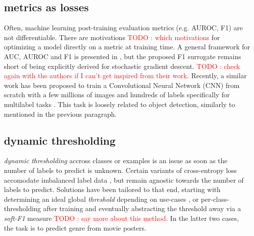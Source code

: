 \documentclass[sigconf,natbib,screen=true,review=true,anonymous]{acmart}
\newcommand\todo[1]{\textcolor{red}{TODO : #1}}
\begin{document}
\subsection{metrics as losses}
\label{sec:org6c111d9}

Often, machine learning post-training evaluation metrics (e.g. AUROC, F1) are not differentiable. There are motivations \todo{which motivations} for optimizing a model directly on a metric at training time. A general framework for AUC, AUROC and F1 is presented in \cite{optimizableLosses}, but the proposed F1 surrogate remains short of being explicitly derived for stochastic gradient descent. \todo{check again with the authors if I can't get inspired from their work}. Recently, a similar work has been proposed to train a Convolutional Neural Network (CNN) from scratch with a few millions of images and hundreds of labels specifically for multilabel tasks \cite{tencent}. This task is loosely related to object detection, similarly to \cite{multitaskLabelImages} mentioned in the previous paragraph.

\subsection{dynamic thresholding}
\label{sec:org543a744}

\emph{dynamic thresholding} accross classes or examples is an issue as soon as the number of labels to predict is unknown. Certain variants of cross-entropy loss accomodate imbalanced label data  \cite{focalLoss}, but remain agnostic towards the number of labels to predict. Solutions have been tailored to that end, starting with determining an ideal global \emph{threshold} depending on use-cases \cite{threshForF1}, or per-class-thresholding after training \cite{moviePosters} and eventually abstracting the threshold away via a \emph{soft-F1} measure \cite{softF1} \todo{say more about this method}. In the latter two cases, the task is to predict genre from movie posters.
\end{document}
